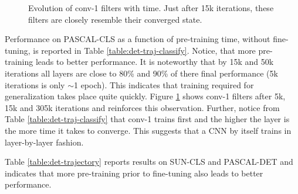 \begin{figure}[t!]
\caption{Evolution of conv-1 filters with time. Just after 15k iterations, these filters are  closely resemble their converged state.}

\label{fig:conv1}
\end{figure}

Performance on PASCAL-CLS as a function of pre-training time, without fine-tuning, is reported in Table \ref{table:det-traj-classify}. Notice, that more pre-training leads to better performance. It is noteworthy that by 15k and 50k iterations all layers are close to 80\% and  90\% of there final performance (5k iterations is only $\sim$1 epoch). This indicates that training required for generalization takes place quite quickly. Figure \ref{fig:conv1} shows conv-1 filters after 5k, 15k and 305k iterations and reinforces this observation. Further, notice from Table \ref{table:det-traj-classify} that conv-1 trains first and the higher the layer is the more time it takes to converge. This suggests that a CNN by itself trains in layer-by-layer fashion.   

Table \ref{table:det-trajectory} reports results on SUN-CLS and PASCAL-DET and indicates that more pre-training prior to fine-tuning also leads to better performance.  



